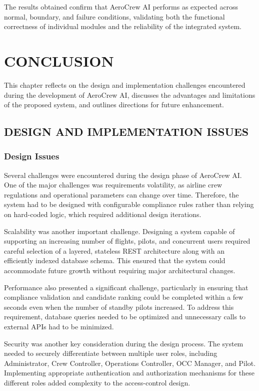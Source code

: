 \documentclass[12pt,a4paper]{report}
\begin{document}
The results obtained confirm that AeroCrew AI performs as expected across normal, boundary, and failure conditions, validating both the functional correctness of individual modules and the reliability of the integrated system.


\chapter{CONCLUSION}

This chapter reflects on the design and implementation challenges encountered during the development of AeroCrew AI, discusses the advantages and limitations of the proposed system, and outlines directions for future enhancement.

\section{DESIGN AND IMPLEMENTATION ISSUES}

\subsection{Design Issues}

Several challenges were encountered during the design phase of AeroCrew AI. One of the major challenges was requirements volatility, as airline crew regulations and operational parameters can change over time. Therefore, the system had to be designed with configurable compliance rules rather than relying on hard-coded logic, which required additional design iterations.

Scalability was another important challenge. Designing a system capable of supporting an increasing number of flights, pilots, and concurrent users required careful selection of a layered, stateless REST architecture along with an efficiently indexed database schema. This ensured that the system could accommodate future growth without requiring major architectural changes.

Performance also presented a significant challenge, particularly in ensuring that compliance validation and candidate ranking could be completed within a few seconds even when the number of standby pilots increased. To address this requirement, database queries needed to be optimized and unnecessary calls to external APIs had to be minimized.

Security was another key consideration during the design process. The system needed to securely differentiate between multiple user roles, including Administrator, Crew Controller, Operations Controller, OCC Manager, and Pilot. Implementing appropriate authentication and authorization mechanisms for these different roles added complexity to the access-control design.
\end{document}
